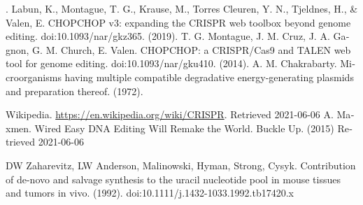 \documentclass[12pt,a4paper,BCOR=.7cm,headsepline,bibliography=totoc]{report}
\begin{document}
%
%
\begin{thebibliography}{1}
\begin{latin}
. 
 {Labun, K., Montague, T. G., Krause, M., Torres Cleuren, Y. N., Tjeldnes, H., \& Valen, E. CHOPCHOP v3: expanding the CRISPR web toolbox beyond genome editing. doi:10.1093/nar/gkz365.  (2019).}
 {T. G. Montague, J. M. Cruz, J. A. Gagnon, G. M. Church, E. Valen. CHOPCHOP: a CRISPR/Cas9 and TALEN web tool for genome editing. doi:10.1093/nar/gku410.  (2014).}
 {A. M. Chakrabarty. Microorganisms having multiple compatible degradative energy-generating plasmids and preparation thereof.  (1972).}

  {Wikipedia. \href{https://en.wikipedia.org/wiki/CRISPR}{\url{https://en.wikipedia.org/wiki/CRISPR}}. Retrieved 2021-06-06}
 {A. Maxmen. Wired Easy DNA Editing Will Remake the World. Buckle Up.  (2015) Retrieved 2021-06-06}

 {DW Zaharevitz, LW Anderson, Malinowski, Hyman, Strong, Cysyk. Contribution of de-novo and salvage synthesis to the uracil nucleotide pool in mouse tissues and tumors in vivo. (1992). doi:10.1111/j.1432-1033.1992.tb17420.x}


\end{latin}
\end{thebibliography}
\end{document}
